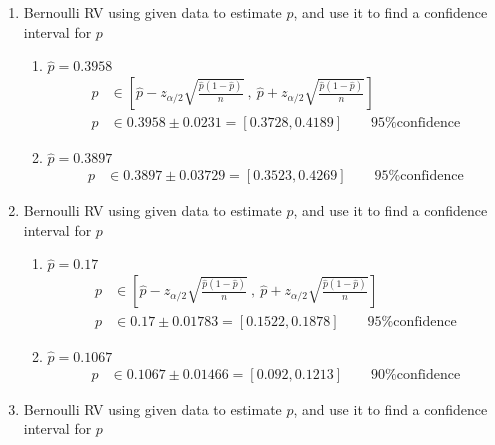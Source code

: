 \begin{enumerate}
	
	\item Bernoulli RV using given data to estimate $ \widehat{p} $, and use it to find a confidence interval for $ p $ \\
	
		\begin{enumerate}
			\item $ \widehat{p}  = 0.3958$ \\
			\begin{align}
				p &\in \left[ \widehat{p} - z_{\alpha/2}\sqrt{\frac{\widehat{p}(1-\widehat{p})}{n}}\ ,\ \widehat{p} + z_{\alpha/2}\sqrt{\frac{\widehat{p}(1-\widehat{p})}{n}}  \right] \nonumber \\
				p &\in 0.3958 \pm 0.0231 = [0.3728, 0.4189] \qquad \text{95\% confidence}
			\end{align}
			
			\item $ \widehat{p}  = 0.3897$ \\
			\begin{align}
				p &\in 0.3897 \pm 0.03729 = [0.3523, 0.4269] \qquad \text{95\% confidence}
			\end{align}
		\end{enumerate}
	
	
	\item Bernoulli RV using given data to estimate $ \widehat{p} $, and use it to find a confidence interval for $ p $ \\
	
		\begin{enumerate}
			\item $ \widehat{p}  = 0.17$ \\
			\begin{align}
				p &\in \left[ \widehat{p} - z_{\alpha/2}\sqrt{\frac{\widehat{p}(1-\widehat{p})}{n}}\ ,\ \widehat{p} + z_{\alpha/2}\sqrt{\frac{\widehat{p}(1-\widehat{p})}{n}}  \right] \nonumber \\
				p &\in 0.17 \pm 0.01783 = [0.1522, 0.1878] \qquad \text{95\% confidence}
			\end{align}
			
			\item $ \widehat{p}  = 0.1067$ \\
			\begin{align}
				p &\in 0.1067 \pm 0.01466 = [0.092, 0.1213] \qquad \text{90\% confidence}
			\end{align}
		\end{enumerate}
	
	
	\item Bernoulli RV using given data to estimate $ \widehat{p} $, and use it to find a confidence interval for $ p $ \\
	

\end{enumerate}
